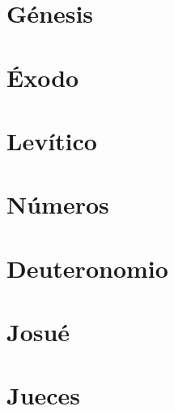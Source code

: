 \chapter{Génesis}
\begin{multicols}{2}
  \raggedcolumns
  \parskip=0pt \relax
  
\end{multicols}

\chapter{Éxodo}
\begin{multicols}{2}
  \raggedcolumns
  \parskip=0pt \relax
  
\end{multicols}

\chapter{Levítico}
\begin{multicols}{2}
  \raggedcolumns
  \parskip=0pt \relax
  
\end{multicols}

\chapter{Números}
\begin{multicols}{2}
  \raggedcolumns
  \parskip=0pt \relax
  
\end{multicols}

\chapter{Deuteronomio}
\begin{multicols}{2}
  \raggedcolumns
  \parskip=0pt \relax
  
\end{multicols}

\chapter{Josué}
\begin{multicols}{2}
  \raggedcolumns
  \parskip=0pt \relax
  
\end{multicols}

\chapter{Jueces}
\begin{multicols}{2}
  \raggedcolumns
  \parskip=0pt \relax
  
\end{multicols}

